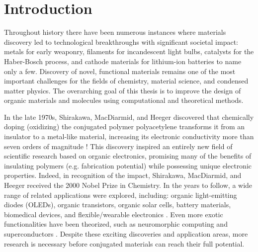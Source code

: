 \chapter{Introduction}

Throughout history there have been numerous instances where materials discovery led to technological breakthroughs with significant societal impact: metals for early weaponry, filaments for incandescent light bulbs, catalysts for the Haber-Bosch process, and cathode materials for lithium-ion batteries to name only a few. Discovery of novel, functional materials remains one of the most important challenges for the fields of chemistry, material science, and condensed matter physics. The overarching goal of this thesis is to improve the design of organic materials and molecules using computational and theoretical methods.

In the late 1970s, Shirakawa, MacDiarmid, and Heeger discovered that chemically doping (oxidizing) the conjugated polymer polyacetylene transforms it from an insulator to a metal-like material, increasing its electronic conductivity more than seven orders of magnitude \cite{Shirakawa1977}! This discovery inspired an entirely new field of scientific research based on organic electronics, promising many of the benefits of insulating polymers (e.g. fabrication potential) while possessing unique electronic properties. Indeed, in recognition of the impact, Shirakawa, MacDiarmid, and Heeger received the 2000 Nobel Prize in Chemistry. In the years to follow, a wide range of related applications were explored, including: organic light-emitting diodes (OLEDs), organic transistors, organic solar cells, battery materials, biomedical devices, and flexible/wearable electronics \cite{Burroughes1990, Sarpeshkar2002, Gunes2007, Liang2012, SmelaE.2003, Oh2016}. Even more exotic functionalities have been theorized, such as neuromorphic computing and superconductors \cite{VanDeBurgt2018, Swager2017}. Despite these exciting discoveries and application areas, more research is necessary before conjugated materials can reach their full potential.

